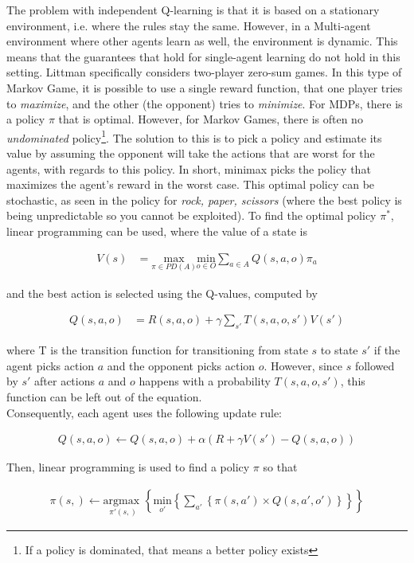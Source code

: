 The problem with independent Q-learning is that it is based on a stationary environment, i.e. where the rules stay the same. However, in a Multi-agent environment where other agents learn as well, the environment is dynamic. This means that the guarantees that hold for single-agent learning do not hold in this setting. Littman \cite{Littman94markovgames} specifically considers two-player zero-sum games. In this type of Markov Game, it is possible to use a single reward function, that one player tries to \textit{maximize}, and the other (the opponent) tries to \textit{minimize}. For MDPs, there is a policy $\pi$ that is optimal. However, for Markov Games, there is often no \textit{undominated} policy\footnote{If a policy is dominated, that means a better policy exists}. The solution to this is to pick a policy and estimate its value by assuming the opponent will take the actions that are worst for the agents, with regards to this policy. In short, minimax picks the policy that maximizes the agent's reward in the worst case. This optimal policy can be stochastic, as seen in the policy for \textit{rock, paper, scissors} (where the best policy is being unpredictable so you cannot be exploited). To find the optimal policy $\pi^*$, linear programming can be used, where the value of a state is
\begin{mdframed}
\begin{align}
V(s) &= \underset{\pi \in PD(A)}{\text{max}} \underset{o \in O}{\text{min}} \sum_{a\in A} Q(s,a,o) \pi_a
\end{align}
\end{mdframed}
and the best action is selected using the Q-values, computed by
\begin{mdframed}
\begin{align}
Q(s,a,o) &= R(s,a,o) + \gamma \sum_{s'} T(s,a,o,s') V(s')
\end{align}
\end{mdframed}
where T is the transition function for transitioning from state $s$ to state $s'$ if the agent picks action $a$ and the opponent picks action $o$. However, since $s$ followed by $s'$ after actions $a$ and $o$ happens with a probability $T(s,a,o,s')$, this function can be left out of the equation.\\

Consequently, each agent uses the following update rule:
\begin{mdframed}
\begin{align}
Q(s,a,o) \leftarrow Q(s,a,o) + \alpha (R + \gamma V(s') - Q(s,a,o))
\end{align}
\label{ref:minimaxrule}
\end{mdframed}
Then, linear programming is used to find a policy $\pi$ so that
\begin{mdframed}
\begin{align}
\pi(s,) \leftarrow \underset{\pi'(s,)}{\text{argmax }} \left\{ \underset{o'}{\text{min}} \left\{ \sum_{a'}  \left\{ \pi(s,a') \times Q(s,a',o') \right\} \right\} \right\}
\end{align}
\end{mdframed}

